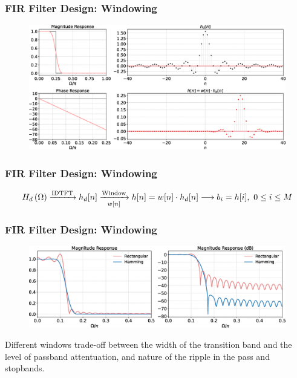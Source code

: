 \documentclass[aspectratio=169]{beamer}
\def\lp{\ensuremath\left(}
\def\rp{\ensuremath\right)}
\begin{document}
\begin{frame}[t]
  \frametitle{FIR Filter Design: Windowing}
  
  \begin{figure}
  \centering
  \includegraphics[width=1\textwidth]{img/firwindowhamm.eps}
  \end{figure}

\end{frame}


\begin{frame}[t]
  \frametitle{FIR Filter Design: Windowing}

  \[ H_d\lp \Omega \rp \xrightarrow[]{\text{IDTFT}} h_d[n] \xrightarrow[{w[n]}]{\text{Window}} h[n] = w[n] \cdot h_d[n] \longrightarrow b_i = h[i], \,\, 0 \leq i \leq M \]

\end{frame}


\begin{frame}[t]
  \frametitle{FIR Filter Design: Windowing}
  
  \begin{figure}
  \centering
  \includegraphics[width=1\textwidth]{img/windowcompare.eps}
  \end{figure}

  Different windows trade-off between the width of the transition band and the level of passband attentuation, and nature of the ripple in the pass and stopbands.
\end{frame}
\end{document}
